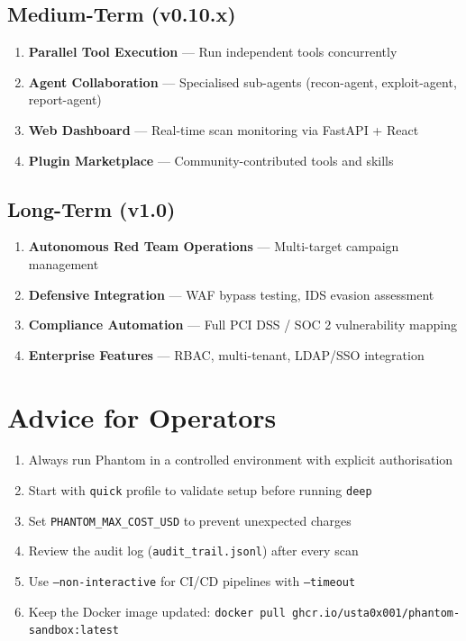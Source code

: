 \documentclass[12pt,a4paper]{report}
\begin{document}
\subsection{Medium-Term (v0.10.x)}
\begin{enumerate}[noitemsep]
  \item \textbf{Parallel Tool Execution} --- Run independent tools concurrently
  \item \textbf{Agent Collaboration} --- Specialised sub-agents (recon-agent, exploit-agent, report-agent)
  \item \textbf{Web Dashboard} --- Real-time scan monitoring via FastAPI + React
  \item \textbf{Plugin Marketplace} --- Community-contributed tools and skills
\end{enumerate}

\subsection{Long-Term (v1.0)}
\begin{enumerate}[noitemsep]
  \item \textbf{Autonomous Red Team Operations} --- Multi-target campaign management
  \item \textbf{Defensive Integration} --- WAF bypass testing, IDS evasion assessment
  \item \textbf{Compliance Automation} --- Full PCI DSS / SOC 2 vulnerability mapping
  \item \textbf{Enterprise Features} --- RBAC, multi-tenant, LDAP/SSO integration
\end{enumerate}

\section{Advice for Operators}
\begin{enumerate}[noitemsep]
  \item Always run Phantom in a controlled environment with explicit authorisation
  \item Start with \texttt{quick} profile to validate setup before running \texttt{deep}
  \item Set \texttt{PHANTOM\_MAX\_COST\_USD} to prevent unexpected charges
  \item Review the audit log (\texttt{audit\_trail.jsonl}) after every scan
  \item Use \texttt{--non-interactive} for CI/CD pipelines with \texttt{--timeout}
  \item Keep the Docker image updated: \texttt{docker pull ghcr.io/usta0x001/phantom-sandbox:latest}
\end{enumerate}
\end{document}
